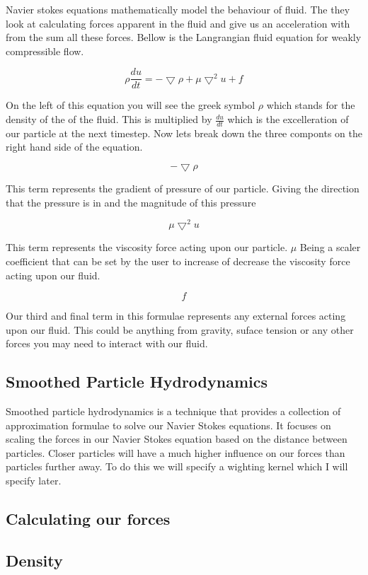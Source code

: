 Navier stokes equations mathematically model the behaviour of fluid. The they look at calculating forces apparent in the fluid and give us an acceleration with from the sum all these forces. Bellow is the Langrangian fluid equation for weakly compressible flow.\par
 \[ \rho\frac{du}{dt}=-\bigtriangledown\rho+\mu\bigtriangledown^2 u + f \]\par
 On the left of this equation you will see the greek symbol $\rho$ which stands for the density of the of the fluid. This is multiplied by $\frac{du}{dt}$ which is the excelleration of our particle at the next timestep. Now lets break down the three componts on the right hand side of the equation.\par
 \[ -\bigtriangledown\rho \]\par
 This term represents the gradient of pressure of our particle. Giving the direction that the pressure is in and the magnitude of this pressure\par
 \[ \mu\bigtriangledown^2 u \]\par
This term represents the viscosity force acting upon our particle. $\mu$ Being a scaler coefficient that can be set by the user to increase of decrease the viscosity force acting upon our fluid.\par
 \[ f \]\par
Our third and final term in this formulae represents any external forces acting upon our fluid. This could be anything from gravity, suface tension or any other forces you may need to interact with our fluid.

\subsection*{Smoothed Particle Hydrodynamics }

Smoothed particle hydrodynamics is a technique that provides a collection of approximation formulae to solve our Navier Stokes equations. It focuses on scaling the forces in our Navier Stokes equation based on the distance between particles. Closer particles will have a much higher influence on our forces than particles further away. To do this we will specify a wighting kernel which I will specify later.

\subsection*{Calculating our forces }

\subsection*{Density }

